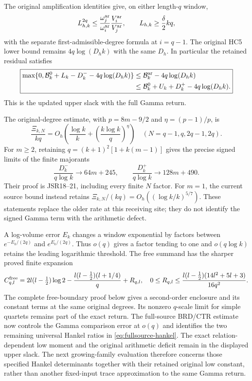 \documentclass[11pt,a4paper]{article}
\begin{document}
The original amplification identities give, on either length-$q$ window,
\begin{equation}
 L_{h,k}^{2q}\le
 \frac{\omega_j^{\rm ar}}{\omega_i^{\rm ar}}
 \frac{V_i^{\rm ar}}{V_j^{\rm ar}},\qquad
 L_{h,k}\ge\frac\delta2 kq,
\end{equation}
with the separate first-admissible-degree formula at $i=q-1$.
The original HC5 lower bound remains $4q\log(D_hk)$ with the
same $D_h$. In particular the retained residual satisfies
\begin{equation}
 \boxed{\begin{aligned}
 \max\{0,\mathcal B_k^0+L_k-D_k^--4q\log(D_hk)\}
 &\le\mathcal B_k^{\rm ar}-4q\log(D_hk)\\
 &\le\mathcal B_k^0+U_k+D_k^+-4q\log(D_hk).
 \end{aligned}}
\end{equation}
This is the updated upper slack with the full Gamma return.

The original-degree estimate, with $p=8m-9/2$ and
$\eta=(p-1)/p$, is
\begin{equation}
 \frac{\Xi_{k,N}}{kq}
 =O_h\!\left(\frac{\log k}{k}
                  +\left(\frac{k\log k}{q}\right)^\eta\right)
 \quad(N=q-1,q,2q-1,2q).
\end{equation}
For $m\ge2$, retaining $q=(k+1)^2[1+k(m-1)]$ gives the precise
signed limits of the finite majorants
\begin{equation}
 \frac{D_k^-}{q\log k}\longrightarrow64m+245,
 \qquad \frac{D_k^+}{q\log k}\longrightarrow128m+490.
\end{equation}
Their proof is JSR18--21, including every finite $N$ factor.
For $m=1$, the current source bound instead retains
$\Xi_{k,N}/(kq)=O_h((\log k/k)^{5/7})$.
These statements replace the older rate at this receiving site;
they do not identify the signed Gamma term with the arithmetic defect.

A log-volume error $E_k$ changes a window exponential by factors
between $e^{-E_k/(2q)}$ and $e^{E_k/(2q)}$. Thus $o(q)$ gives a
factor tending to one and $o(q\log k)$ retains the leading logarithmic
threshold. The free summand has the sharper proved finite expansion
\begin{equation}
 C_{q,l}^{\rm free}=2l(l-\tfrac12)\log2
 -\frac{l(l-\tfrac12)(l+1/4)}q+R_{q,l},\quad
 0\le R_{q,l}\le\frac{l(l-\tfrac12)(14l^2+5l+3)}{16q^2}.
\end{equation}
The complete free-boundary proof below gives a second-order enclosure
and its constant terms at the same original degrees. Its nonzero
$q$-scale limit for simple quartets remains part of the exact return.
The full-source BRD/CTR estimate now controls the Gamma
comparison error at $o(q)$ and identifies the two remaining
universal Hankel ratios in \eqref{eq:fullsource-hankel}.
The exact relation-dependent low moment and the original
arithmetic deficit remain in the displayed upper slack.
The next growing-family evaluation therefore concerns
those specified Hankel determinants together with their
retained original low constant, rather than another
fixed-input trace approximation to the same Gamma return.
\end{document}
